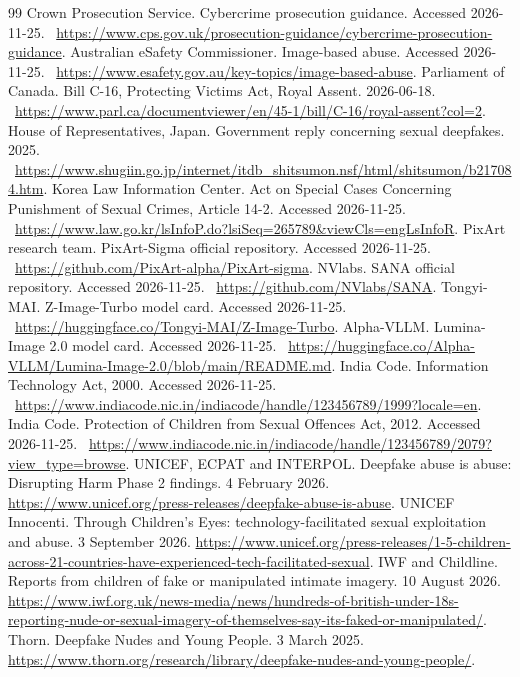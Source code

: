 \documentclass[10pt,a4paper]{article}
\begin{document}
\begin{thebibliography}{99}
 Crown Prosecution Service. Cybercrime prosecution guidance. Accessed 2026-11-25. \ \url{https://www.cps.gov.uk/prosecution-guidance/cybercrime-prosecution-guidance}.
 Australian eSafety Commissioner. Image-based abuse. Accessed 2026-11-25. \ \url{https://www.esafety.gov.au/key-topics/image-based-abuse}.
 Parliament of Canada. Bill C-16, Protecting Victims Act, Royal Assent. 2026-06-18. \ \url{https://www.parl.ca/documentviewer/en/45-1/bill/C-16/royal-assent?col=2}.
 House of Representatives, Japan. Government reply concerning sexual deepfakes. 2025. \ \url{https://www.shugiin.go.jp/internet/itdb_shitsumon.nsf/html/shitsumon/b217084.htm}.
 Korea Law Information Center. Act on Special Cases Concerning Punishment of Sexual Crimes, Article 14-2. Accessed 2026-11-25. \ \url{https://www.law.go.kr/lsInfoP.do?lsiSeq=265789&viewCls=engLsInfoR}.
 PixArt research team. PixArt-Sigma official repository. Accessed 2026-11-25. \ \url{https://github.com/PixArt-alpha/PixArt-sigma}.
 NVlabs. SANA official repository. Accessed 2026-11-25. \ \url{https://github.com/NVlabs/SANA}.
 Tongyi-MAI. Z-Image-Turbo model card. Accessed 2026-11-25. \ \url{https://huggingface.co/Tongyi-MAI/Z-Image-Turbo}.
 Alpha-VLLM. Lumina-Image 2.0 model card. Accessed 2026-11-25. \ \url{https://huggingface.co/Alpha-VLLM/Lumina-Image-2.0/blob/main/README.md}.
 India Code. Information Technology Act, 2000. Accessed 2026-11-25. \ \url{https://www.indiacode.nic.in/indiacode/handle/123456789/1999?locale=en}.
 India Code. Protection of Children from Sexual Offences Act, 2012. Accessed 2026-11-25. \ \url{https://www.indiacode.nic.in/indiacode/handle/123456789/2079?view_type=browse}.
 UNICEF, ECPAT and INTERPOL. Deepfake abuse is abuse: Disrupting Harm Phase 2 findings. 4 February 2026. \url{https://www.unicef.org/press-releases/deepfake-abuse-is-abuse}.
 UNICEF Innocenti. Through Children's Eyes: technology-facilitated sexual exploitation and abuse. 3 September 2026. \url{https://www.unicef.org/press-releases/1-5-children-across-21-countries-have-experienced-tech-facilitated-sexual}.
 IWF and Childline. Reports from children of fake or manipulated intimate imagery. 10 August 2026. \url{https://www.iwf.org.uk/news-media/news/hundreds-of-british-under-18s-reporting-nude-or-sexual-imagery-of-themselves-say-its-faked-or-manipulated/}.
 Thorn. Deepfake Nudes and Young People. 3 March 2025. \url{https://www.thorn.org/research/library/deepfake-nudes-and-young-people/}.

\end{thebibliography}
\end{document}
